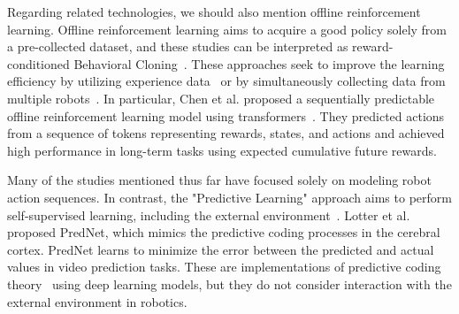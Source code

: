 Regarding related technologies, we should also mention offline reinforcement learning. Offline reinforcement learning aims to acquire a good policy solely from a pre-collected dataset, and these studies can be interpreted as reward-conditioned Behavioral Cloning~\cite{actionablemodels2021arxiv,ma2022vip}. These approaches seek to improve the learning efficiency by utilizing experience data~\cite{kalashnikov2018qt} or by simultaneously collecting data from multiple robots~\cite{kalashnikov2021mt}. In particular, Chen et al. proposed a sequentially predictable offline reinforcement learning model using transformers~\cite{chen2021decision}. They predicted actions from a sequence of tokens representing rewards, states, and actions and achieved high performance in long-term tasks using expected cumulative future rewards.


Many of the studies mentioned thus far have focused solely on modeling robot action sequences. In contrast, the "Predictive Learning" approach aims to perform self-supervised learning, including the external environment~\cite{lotter2016deep}. Lotter et al. proposed PredNet, which mimics the predictive coding processes in the cerebral cortex. PredNet learns to minimize the error between the predicted and actual values in video prediction tasks. These are implementations of predictive coding theory~\cite{Rao1999} using deep learning models, but they do not consider interaction with the external environment in robotics.


